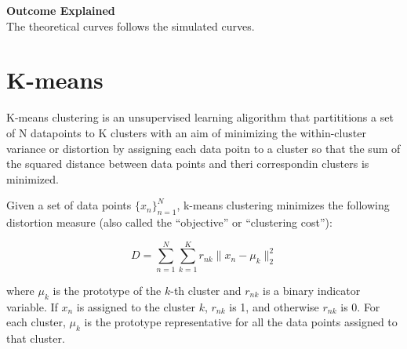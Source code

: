 \documentclass{article}
\begin{document}
\begin{enumerate}
    \textbf{Outcome Explained}\\
    The theoretical curves follows the simulated curves.
\end{enumerate}

\clearpage

\section{K-means}
K-means clustering is an unsupervised learning aligorithm that partititions a set of N datapoints to K clusters with an aim of minimizing the within-cluster variance or distortion
by assigning each data poitn to a cluster so that the sum of the squared distance between data points and theri correspondin clusters is minimized.





Given a set of data points $\{x_n\}_{n=1}^N$, k-means clustering minimizes the following distortion measure (also called the ``objective'' or ``clustering cost''):



\[
D = \sum_{n=1}^N \sum_{k=1}^K r_{nk} \|x_n - \mu_k\|_2^2
\]



where $\mu_k$ is the prototype of the $k$-th cluster and $r_{nk}$ is a binary indicator variable. If $x_n$ is assigned to the cluster $k$, $r_{nk}$ is 1, and otherwise $r_{nk}$ is 0. For each cluster, $\mu_k$ is the prototype representative for all the data points assigned to that cluster.
\end{document}

